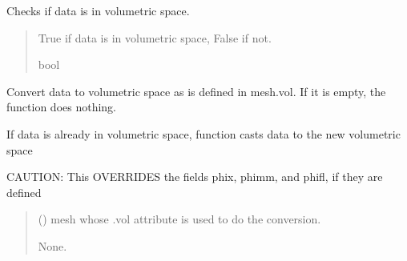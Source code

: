 \documentclass[letterpaper,10pt,english]{sphinxmanual}
\begin{document}
\begin{fulllineitems}
\begin{fulllineitems}
\label{\detokenize{_autosummary/nirfasterff.base.data.FLdata:nirfasterff.base.data.FLdata.isvol}}
\pysigstartsignatures
{}
\pysigstopsignatures
\sphinxAtStartPar
Checks if data is in volumetric space.
\begin{quote}\begin{description}
\sphinxAtStartPar
True if data is in volumetric space, False if not.

\sphinxAtStartPar
bool

\end{description}\end{quote}

\end{fulllineitems}


\begin{fulllineitems}
\label{\detokenize{_autosummary/nirfasterff.base.data.FLdata:nirfasterff.base.data.FLdata.togrid}}
\pysigstartsignatures
{}
\pysigstopsignatures
\sphinxAtStartPar
Convert data to volumetric space as is defined in mesh.vol. If it is empty, the function does nothing.

\sphinxAtStartPar
If data is already in volumetric space, function casts data to the new volumetric space

\sphinxAtStartPar
CAUTION: This OVERRIDES the fields phix, phimm, and phifl, if they are defined
\begin{quote}\begin{description}
\sphinxAtStartPar
{} () \textendash{} mesh whose .vol attribute is used to do the conversion.

\sphinxAtStartPar
None.

\end{description}\end{quote}

\end{fulllineitems}



\end{fulllineitems}
\end{document}

